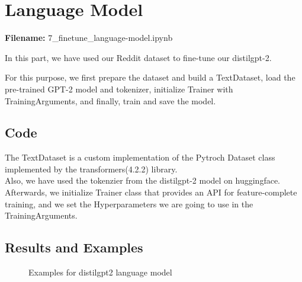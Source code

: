 \documentclass[12pt, a4paper]{article}
\begin{document}
\section*{Language Model}
\large{\textbf{Filename:} 7\_finetune\_language-model.ipynb}

In this part, we have used our Reddit dataset to fine-tune our distilgpt-2.

For this purpose, we first prepare the dataset and build a TextDataset, load the pre-trained GPT-2 model and tokenizer, initialize Trainer with TrainingArguments, and finally, train and save the model. 

\subsection*{Code}
The TextDataset is a custom implementation of the Pytroch Dataset class implemented by the transformers(4.2.2) library.
\\Also, we have used the tokenzier from the distilgpt-2 model on huggingface.
\\Afterwards, we initialize Trainer class that provides an API for feature-complete training, and we set the Hyperparameters we are going to use in the TrainingArguments.

\subsection*{Results and Examples}
\begin{figure}[H]
	\caption{Examples for distilgpt2 language model}
	\label{finetune-lm_examples.png}
\end{figure}
%


\newpage
\end{document}
